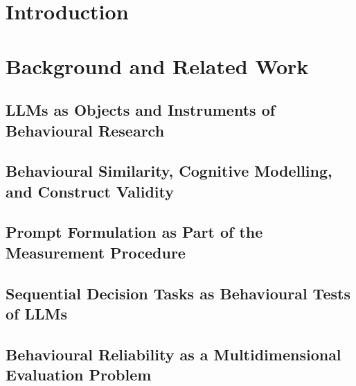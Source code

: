 \documentclass[logo,msc]{infthesis}           %
\begin{document}
\hypertarget{introduction}{%
\chapter{Introduction}\label{introduction}}

\hypertarget{background-and-related-work}{%
\chapter{Background and Related Work}\label{background-and-related-work}}

\hypertarget{llms-as-objects-and-instruments-of-behavioural-research}{%
\section{LLMs as Objects and Instruments of Behavioural Research}\label{llms-as-objects-and-instruments-of-behavioural-research}}

\hypertarget{behavioural-similarity-cognitive-modelling-and-construct-validity}{%
\section{Behavioural Similarity, Cognitive Modelling, and Construct Validity}\label{behavioural-similarity-cognitive-modelling-and-construct-validity}}

\hypertarget{prompt-formulation-as-part-of-the-measurement-procedure}{%
\section{Prompt Formulation as Part of the Measurement Procedure}\label{prompt-formulation-as-part-of-the-measurement-procedure}}

\hypertarget{sequential-decision-tasks-as-behavioural-tests-of-llms}{%
\section{Sequential Decision Tasks as Behavioural Tests of LLMs}\label{sequential-decision-tasks-as-behavioural-tests-of-llms}}

\hypertarget{behavioural-reliability-as-a-multidimensional-evaluation-problem}{%
\section{Behavioural Reliability as a Multidimensional Evaluation Problem}\label{behavioural-reliability-as-a-multidimensional-evaluation-problem}}
\end{document}
